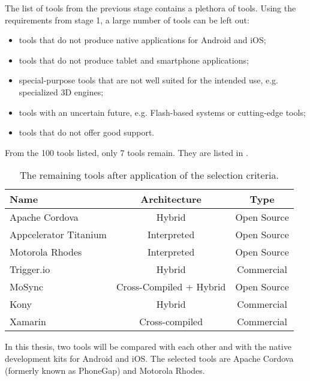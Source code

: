 The list of tools from the previous stage contains a plethora of tools. Using the requirements from stage 1, a large number of tools can be left out:

\begin{itemize}
    \item tools that do not produce native applications for Android and iOS;
    \item tools that do not produce tablet and smartphone applications;
    \item special-purpose tools that are not well suited for the intended use, e.g. specialized 3D engines;
    \item tools with an uncertain future, e.g. Flash-based systems or cutting-edge tools;
    \item tools that do not offer good support. 
\end{itemize}

From the 100 tools listed, only 7 tools remain. They are listed in .

\begin{table}[h!]
    \begin{center}
        \begin{tabular}{l|c|c}
            \textbf{Name} & \textbf{Architecture} & \textbf{Type} \\
            \hline 
            Apache Cordova & Hybrid & Open Source \\
            Appcelerator Titanium & Interpreted & Open Source \\
            Motorola Rhodes & Interpreted & Open Source \\
            Trigger.io & Hybrid & Commercial \\
            MoSync & Cross-Compiled + Hybrid & Open Source \\
            Kony & Hybrid & Commercial \\
            Xamarin & Cross-compiled & Commercial \\
        \end{tabular}
        \caption{The remaining tools after application of the selection criteria.}
        \label{table:tools}
    \end{center}
\end{table}

In this thesis, two tools will be compared with each other and with the native development kits for Android and iOS. The selected tools are Apache Cordova (formerly known as PhoneGap) and Motorola Rhodes. 

